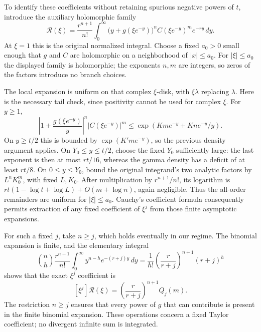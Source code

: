 To identify these coefficients without retaining spurious negative
powers of $t$, introduce the auxiliary holomorphic family
\[
 \mathcal R(\xi)=\frac{r^{n+1}}{n!}
   \int_0^\infty
      \bigl(y+g(\xi e^{-y})\bigr)^n C(\xi e^{-y})^m e^{-ry}\,dy.
\]
At $\xi=1$ this is the original normalized integral. Choose a fixed
$a_0>0$ small enough that $g$ and $C$ are holomorphic on a
neighborhood of $|x|\leq a_0$. For $|\xi|\leq a_0$ the displayed
family is holomorphic; the exponents $n,m$ are integers, so zeros
of the factors introduce no branch choices.

The local expansion is uniform on that complex $\xi$-disk, with
$\xi\lambda$ replacing $\lambda$. Here is the necessary tail check,
since positivity cannot be used for complex $\xi$. For $y\geq1$,
\[
 \left|1+\frac{g(\xi e^{-y})}{y}\right|^n
       |C(\xi e^{-y})|^m
 \leq\exp\left(Kme^{-y}+Kne^{-y}/y\right).
\]
On $y\geq t/2$ this is bounded by $\exp(K'me^{-y})$, so the
previous density argument applies. On $Y_0\leq y\leq t/2$,
choose the fixed $Y_0$ sufficiently large: the last exponent is
then at most $rt/16$, whereas the gamma density has a deficit of
at least $rt/8$. On $0\leq y\leq Y_0$, bound the original
integrand's two analytic factors by $L^nK_0^m$, with fixed
$L,K_0$. After multiplication by $r^{n+1}/n!$, its logarithm is
$rt(1-\log t+\log L)+O(m+\log n)$, again negligible.
Thus the all-order remainders are uniform for $|\xi|\leq a_0$.
Cauchy's coefficient formula consequently permits extraction of any
fixed coefficient of $\xi^j$ from those finite asymptotic expansions.

For such a fixed $j$, take $n\geq j$, which holds eventually in
our regime. The binomial expansion is finite, and the elementary
integral
\[
 \binom nh\frac{r^{n+1}}{n!}
 \int_0^\infty y^{n-h}e^{-(r+j)y}\,dy
 =\frac1{h!}\left(\frac r{r+j}\right)^{n+1}(r+j)^h
\]
shows that the exact $\xi^j$ coefficient is
\begin{equation}\label{joint:eq:coefficient-integration}
 [\xi^j]\mathcal R(\xi)
   =\left(\frac r{r+j}\right)^{n+1}Q_j(m).
\end{equation}
The restriction $n\geq j$ ensures that every power of $g$ that can
contribute is present in the finite binomial expansion.
These operations concern a fixed Taylor coefficient; no divergent
infinite sum is integrated.

